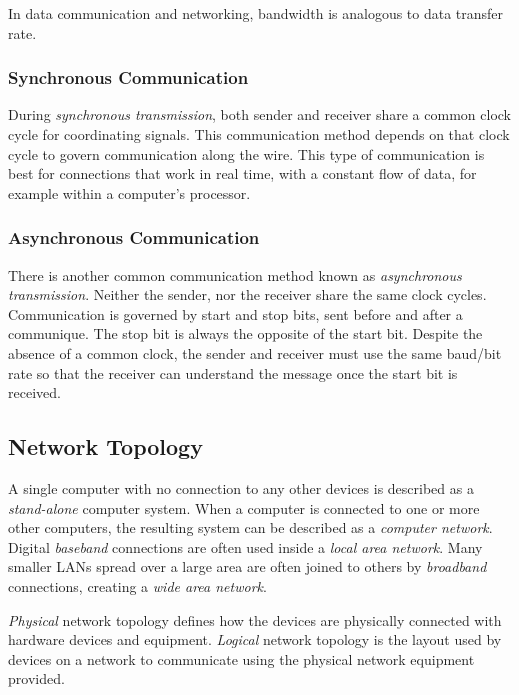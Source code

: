 \documentclass[9pt]{article}
\begin{document}
In data communication and networking, bandwidth is analogous to data transfer rate.

\subsubsection{Synchronous Communication}
\label{sec:org2203347}

During \emph{synchronous transmission}, both sender and receiver share a common clock cycle for coordinating signals. This communication method depends on that clock cycle to govern communication along the wire. This type of communication is best for connections that work in real time, with a constant flow of data, for example within a computer's processor.

\subsubsection{Asynchronous Communication}
\label{sec:orgeb59375}

There is another common communication method known as \emph{asynchronous transmission}. Neither the sender, nor the receiver share the same clock cycles. Communication is governed by start and stop bits, sent before and after a communique. The stop bit is always the opposite of the start bit. Despite the absence of a common clock, the sender and receiver must use the same baud/bit rate so that the receiver can understand the message once the start bit is received.

\subsection{Network Topology}
\label{sec:org7552a10}

A single computer with no connection to any other devices is described as a \emph{stand-alone} computer system. When a computer is connected to one or more other computers, the resulting system can be described as a \emph{computer network}. Digital \emph{baseband} connections are often used inside a \emph{local area network}. Many smaller LANs spread over a large area are often joined to others by \emph{broadband} connections, creating a \emph{wide area network}.

\emph{Physical} network topology defines how the devices are physically connected with hardware devices and equipment. \emph{Logical} network topology is the layout used by devices on a network to communicate using the physical network equipment provided.
\end{document}
